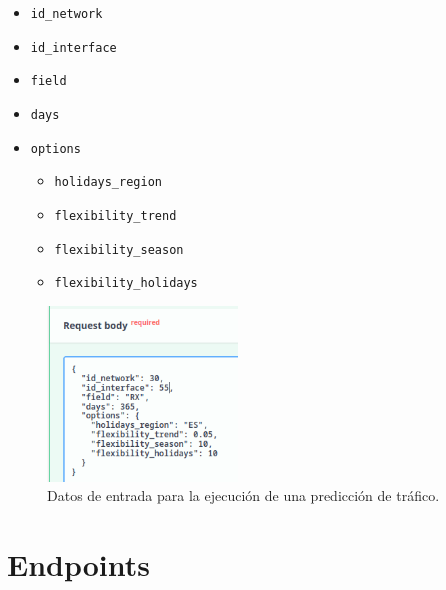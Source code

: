 \documentclass[a4paper, oneside, 12pt]{book}
\begin{document}
	\begin{itemize}
		\item \texttt{id\_network}
		
		\item \texttt{id\_interface}
		
		\item \texttt{field}
		
		\item \texttt{days}
		
		\item \texttt{options}
		
		\begin{itemize}
			\item \texttt{holidays\_region}
			
			\item \texttt{flexibility\_trend}
			
			\item \texttt{flexibility\_season}
			
			\item \texttt{flexibility\_holidays}
		\end{itemize}
	\end{itemize}
	
	\begin{figure}[h!]
		\begin{center}
			\includegraphics[width=0.45\textwidth]{img/prophet_schema.png}
			\caption{Datos de entrada para la ejecución de una predicción de tráfico.}
			\label{img: prophet schema}
		\end{center}
	\end{figure}

	\pagebreak
	
	\section{Endpoints}
	
	
\end{document}
